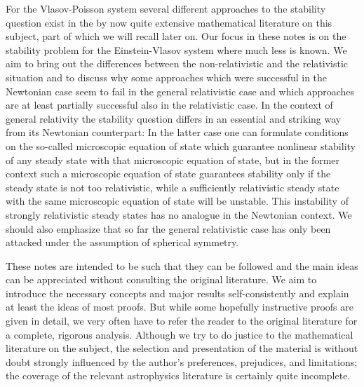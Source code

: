 \documentclass[11pt]{article}
\begin{document}
For the Vlasov-Poisson system several different approaches
to the stability question exist in the by now quite extensive
mathematical literature on this subject, part of which we will
recall later on. Our focus in these notes is on the stability problem for the
Einstein-Vlasov system where much less is known. We aim to
bring out the differences between the non-relativistic and the relativistic
situation and to discuss why some approaches which were successful in the
Newtonian case seem to fail in the general relativistic case and which
approaches are at least partially successful also in the relativistic case.
In the
context of general relativity the stability
question differs in an essential and striking way from its Newtonian
counterpart: In the latter case one can formulate conditions on the
so-called microscopic equation of state  which guarantee
nonlinear stability of any steady state with that
microscopic equation of state, but in the former context such a microscopic
equation of state guarantees stability only if the steady state
is not too relativistic, while a sufficiently relativistic steady state
with the same microscopic equation of state will be unstable.
This instability of strongly relativistic steady states
has no analogue in the Newtonian context.
We should also emphasize that so far the general relativistic case has only
been attacked under the assumption of spherical symmetry.

These notes are intended to be such that they can be followed
and the main ideas can be appreciated without consulting the original
literature. We aim to introduce the necessary concepts and major results
self-consistently and explain at least the ideas of most proofs.
But while some hopefully instructive proofs are given in detail,
we very often have to refer the reader to the original literature
for a complete,
rigorous analysis. Although we try to do justice to the mathematical literature
on the subject, the selection and presentation of the material
is without doubt strongly influenced by
the author's preferences, prejudices, and limitations; the coverage of the
relevant astrophysics literature is certainly quite incomplete.
\end{document}
